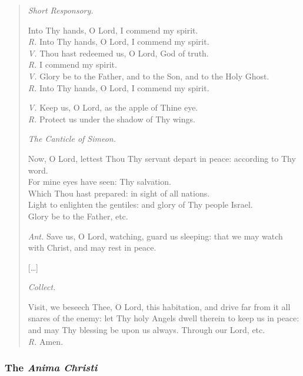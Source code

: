 \begin{quote}
\textit{Short Responsory.}

Into Thy hands, O Lord, I commend my spirit.\\
\textit{R.} Into Thy hands, O Lord, I commend my spirit.\\
\textit{V.} Thou hast redeemed us, O Lord, God of truth.\\
\textit{R.} I commend my spirit.\\
\textit{V.} Glory be to the Father, and to the Son, and to the Holy Ghost.\\
\textit{R.} Into Thy hands, O Lord, I commend my spirit.

\textit{V.} Keep us, O Lord, as the apple of Thine eye.\\
\textit{R.} Protect us under the shadow of Thy wings.

\textit{The Canticle of Simeon.}

Now, O Lord, lettest Thou Thy servant depart in peace: according to Thy word.\\
For mine eyes have seen: Thy salvation.\\
Which Thou hast prepared: in sight of all nations.\\
Light to enlighten the gentiles: and glory of Thy people Israel.\\
Glory be to the Father, etc.

\textit{Ant.} Save us, O Lord, watching, guard us sleeping: that we may watch with Christ, and may rest in peace.

[\ldots]

\textit{Collect.}

Visit, we beseech Thee, O Lord, this habitation, and drive far from it all snares of the enemy: let Thy holy Angels dwell therein to keep us in peace: and may Thy blessing be upon us always. Through our Lord, etc.\\
\textit{R.} Amen.
\end{quote}

\subsubsection*{The \textit{Anima Christi}}

